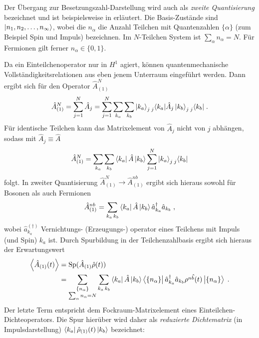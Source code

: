 Der Übergang zur Besetzungszahl-Darstellung wird auch als  \emph{zweite Quantisierung} bezeichnet und ist beispielsweise in \cite{czycholl} erläutert. Die Basis-Zustände sind $\ket{n_1,n_2,\dots,n_{\infty}}$, wobei die $n_{\alpha}$ die Anzahl Teilchen mit Quantenzahlen $\{\alpha\}$ (zum Beispiel Spin und Impuls) bezeichnen.  Im $N$-Teilchen System ist $\sum_{\alpha} n_{\alpha} = N$. Für Fermionen gilt ferner $n_{\alpha} \in \{0,1\}$.

Da ein Einteilchenoperator nur in $H^1$ agiert, können quantenmechanische Vollständigkeitsrelationen aus eben jenem Unterraum eingeführt werden. Dann ergibt sich für den Operator $\hat{A}^N_{(1)}$
\begin{align*}
  \hat{A}^N_{(1)} = \sum_{j=1}^N \hat{A}_j = \sum_{j=1}^N \sum_{k_a} \sum_{k_b} \ket{k_a}_{j} \prescript{}{j}{\bra{k_a}}\hat{A}_j \ket{k_b}_{j} \prescript{}{j}{\bra{k_b}} \; .
\end{align*}
Für identische Teilchen kann das Matrixelement von $\hat{A}_j$ nicht von $j$ abhängen, sodass mit $\hat{A}_j \equiv \hat{A}$
\begin{equation*}
  \hat{A}^N_{(1)} = \sum_{k_a} \sum_{k_b} \bra{k_a}\hat{A} \ket{k_b} \sum_{j=1}^N \ket{k_a}_{j}  \prescript{}{j}{\bra{k_b}}
\end{equation*}
folgt. In zweiter Quantisierung $\hat{A}^N_{(1)} \rightarrow \hat{A}^{nb}_{(1)}$ ergibt sich hieraus sowohl für Bosonen als auch Fermionen \cite{modern}
\begin{align*}
  \hat{A}^{nb}_{(1)} = \sum_{k_a \, k_b} \bra{k_a}\hat{A} \ket{k_b} \hat{a}^{\dagger}_{k_a}\hat{a}_{k_b} \; ,
\end{align*}
wobei $\hat{a}_{k_a}^{(\dagger)}$ Vernichtungs- (Erzeugungs-) operator eines Teilchens mit Impuls (und Spin) $k_a$ ist. Durch Spurbildung in der Teilchenzahlbasis ergibt sich hieraus der Erwartungswert
\begin{align*}
  \expval{\hat{A}_{(1)}(t)} &= \text{Sp}(\hat{A}_{(1)}\hat{\rho}(t)) \\
  &= \sum_{\substack{\{n_{\alpha}\} \\ \sum_{\alpha} n_{\alpha} = N}} \sum_{k_a \, k_b} \bra{k_a}\hat{A} \ket{k_b}
  \bra{\{n_{\alpha}\}} \hat{a}^{\dagger}_{k_a}\hat{a}_{k_b} \hat{\rho^{nb}(t)}  \ket{\{n_{\alpha}\}} \; .
\end{align*}
Der letzte Term entspricht dem Fockraum-Matrixelement eines Einteilchen-Dichteoperators. Die Spur hierüber wird daher als \emph{reduzierte Dichtematrix} (in Impulsdarstellung) $\bra{k_a}\hat{\rho}_{(1)}(t)\ket{k_b}$ bezeichnet:
